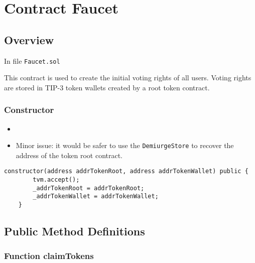 
\chapter{Contract Faucet}

\minitoc

\section{Overview}


In file {\tt Faucet.sol}

This contract is used to create the initial voting rights of all
users. Voting rights are stored in TIP-3 token wallets created by a
root token contract.

\subsection{Constructor}

\begin{itemize}
\item {}
\item Minor issue: it would be safer to use the {\tt DemiurgeStore} to
  recover the address of the token root contract.
\end{itemize}

\begin{lstlisting}[firstnumber=22]
    constructor(address addrTokenRoot, address addrTokenWallet) public {
        tvm.accept();
        _addrTokenRoot = addrTokenRoot;
        _addrTokenWallet = addrTokenWallet;
    }
\end{lstlisting}

\section{Public Method Definitions}

\subsection{Function claimTokens}

